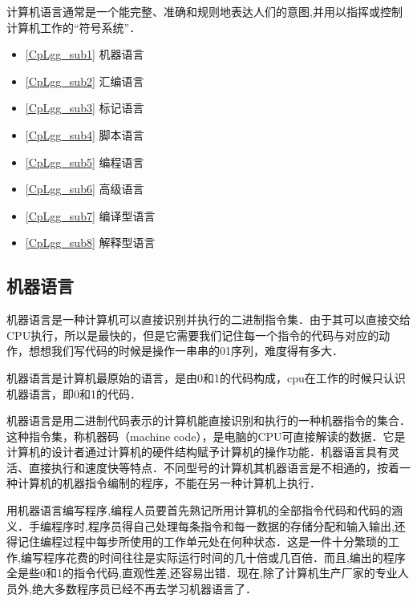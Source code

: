 
计算机语言通常是一个能完整、准确和规则地表达人们的意图,并用以指挥或控制计算机工作的“符号系统”．

\begin{itemize}
\item \autoref{CpLgg_sub1} 机器语言

\item \autoref{CpLgg_sub2} 汇编语言

\item \autoref{CpLgg_sub3} 标记语言

\item \autoref{CpLgg_sub4} 脚本语言

\item \autoref{CpLgg_sub5} 编程语言

\item \autoref{CpLgg_sub6} 高级语言

\item \autoref{CpLgg_sub7} 编译型语言

\item \autoref{CpLgg_sub8} 解释型语言
\end{itemize}

\subsection{机器语言}\label{CpLgg_sub1}

机器语言是一种计算机可以直接识别并执行的二进制指令集．由于其可以直接交给CPU执行，所以是最快的，但是它需要我们记住每一个指令的代码与对应的动作，想想我们写代码的时候是操作一串串的01序列，难度得有多大．

机器语言是计算机最原始的语言，是由0和1的代码构成，cpu在工作的时候只认识机器语言，即0和1的代码．

机器语言是用二进制代码表示的计算机能直接识别和执行的一种机器指令的集合．这种指令集，称机器码（machine code），是电脑的CPU可直接解读的数据．它是计算机的设计者通过计算机的硬件结构赋予计算机的操作功能．机器语言具有灵活、直接执行和速度快等特点．不同型号的计算机其机器语言是不相通的，按着一种计算机的机器指令编制的程序，不能在另一种计算机上执行．

用机器语言编写程序,编程人员要首先熟记所用计算机的全部指令代码和代码的涵义．手编程序时,程序员得自己处理每条指令和每一数据的存储分配和输入输出,还得记住编程过程中每步所使用的工作单元处在何种状态．这是一件十分繁琐的工作,编写程序花费的时间往往是实际运行时间的几十倍或几百倍．而且,编出的程序全是些0和1的指令代码,直观性差,还容易出错．现在,除了计算机生产厂家的专业人员外,绝大多数程序员已经不再去学习机器语言了．

